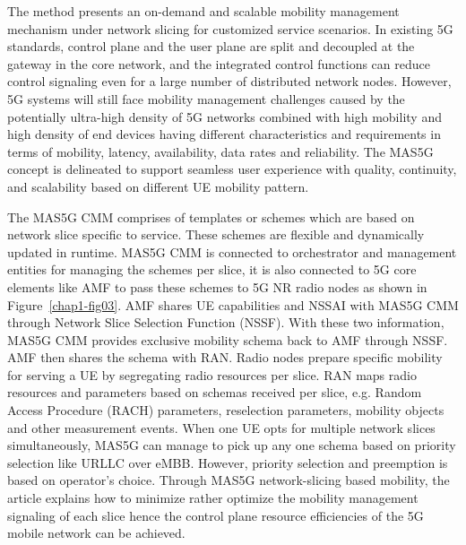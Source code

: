 \begin{multicols}{2}
The method presents an on-demand and scalable mobility management mechanism under network slicing for customized service scenarios. In existing 5G standards, control plane and the user plane are split and decoupled at the gateway in the core network, and the integrated control functions can reduce control signaling even for a large number of distributed network nodes. However, 5G systems will still face mobility management challenges caused by the potentially ultra-high density of 5G networks combined with high mobility and high density of end devices having different characteristics and requirements in terms of mobility, latency, availability, data rates and reliability. The MAS5G concept is delineated to support seamless user experience with quality, continuity, and scalability based on different UE mobility pattern.

The MAS5G CMM comprises of templates or schemes which are based on network slice specific to service. These schemes are flexible and dynamically updated in runtime. MAS5G CMM is connected to orchestrator and management entities for managing the schemes per slice, it is also connected to 5G core elements like AMF to pass these schemes to 5G NR radio nodes as shown in Figure~\ref{chap1-fig03}. AMF shares UE capabilities and NSSAI with MAS5G CMM through Network Slice Selection Function (NSSF). With these two information, MAS5G CMM provides exclusive mobility schema back to AMF through NSSF. AMF then shares the schema with RAN. Radio nodes prepare specific mobility for serving a UE by segregating radio resources per slice. RAN maps radio resources and parameters based on schemas received per slice, e.g. Random Access Procedure (RACH) parameters, reselection parameters, mobility objects and other measurement events. When one UE opts for multiple network slices simultaneously, MAS5G can manage to pick up any one schema based on priority selection like URLLC over eMBB. However, priority selection and preemption is based on operator’s choice. Through MAS5G network-slicing based mobility, the article explains how to minimize rather optimize the mobility management signaling of each slice hence the control plane resource efficiencies of the 5G mobile network can be achieved. 
\end{multicols}

